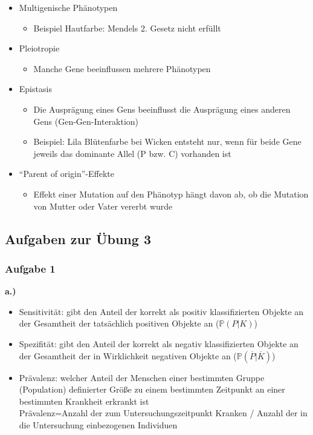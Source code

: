 \begin{itemize}
    \item Multigenische Phänotypen
        \begin{itemize}
            \item Beispiel Hautfarbe: Mendels 2. Gesetz nicht erfüllt
        \end{itemize}
    \item Pleiotropie
        \begin{itemize}
            \item Manche Gene beeinflussen mehrere Phänotypen
        \end{itemize}
    \item Epistasis
        \begin{itemize}
            \item Die Ausprägung eines Gens beeinflusst die Ausprägung eines anderen Gens (Gen-Gen-Interaktion)
            \item Beispiel: Lila Blütenfarbe bei Wicken entsteht nur, wenn für beide Gene jeweils das dominante Allel (P bzw. C) vorhanden ist
        \end{itemize}
    \item ``Parent of origin''-Effekte
        \begin{itemize}
            \item Effekt einer Mutation auf den Phänotyp hängt davon ab, ob die Mutation von Mutter oder Vater vererbt wurde
        \end{itemize}
\end{itemize}

\subsection{Aufgaben zur Übung 3}
\subsubsection{Aufgabe 1}
\textbf{a.)}
\begin{itemize}
	\item Sensitivität: gibt den Anteil der korrekt als positiv klassifizierten Objekte an der Gesamtheit der tatsächlich positiven Objekte an ($\mathbb{P}(P|K)$)
	\item Spezifität: gibt den Anteil der korrekt als negativ klassifizierten Objekte an der Gesamtheit der in Wirklichkeit negativen Objekte an ($\mathbb{P}(\overline{P}|\overline{K})$)
	\item Prävalenz: welcher Anteil der Menschen einer bestimmten Gruppe (Population) definierter Größe zu einem bestimmten Zeitpunkt an einer bestimmten Krankheit erkrankt ist\\
	Prävalenz=Anzahl der zum Untersuchungszeitpunkt Kranken / Anzahl der in die Untersuchung einbezogenen Individuen
\end{itemize}


